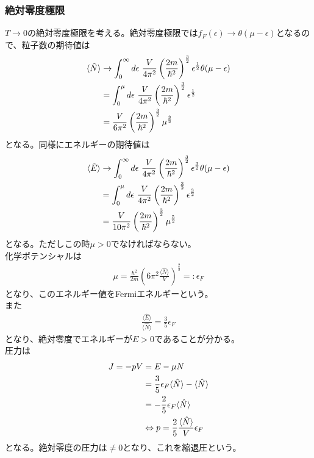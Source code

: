 \documentclass{jsarticle}  %
\numberwithin{equation}{section} %
\numberwithin{figure}{section}
\begin{document}
\subsubsection{絶対零度極限}
    $T \rightarrow 0$の絶対零度極限を考える。絶対零度極限では$f_F (\epsilon) \rightarrow \theta (\mu - \epsilon)$となるので、粒子数の期待値は
    \begin{align}
        \langle \hat{N} \rangle &\rightarrow \int_0^{\infty} d\epsilon\ \frac{V}{4 \pi^2} \left( \frac{2m}{\hbar^2} \right)^{\frac{3}{2}} \epsilon^\frac{1}{2} \theta (\mu - \epsilon) \notag \\
        &= \int_0^{\mu} d\epsilon\ \frac{V}{4 \pi^2} \left( \frac{2m}{\hbar^2} \right)^{\frac{3}{2}} \epsilon^\frac{1}{2} \notag \\
        &= \frac{V}{6 \pi^2} \left( \frac{2m}{\hbar^2} \right)^{\frac{3}{2}} \mu^\frac{3}{2}
    \end{align}
    となる。同様にエネルギーの期待値は
    \begin{align}
        \langle \hat{E} \rangle &\rightarrow \int_0^{\infty} d\epsilon\  \frac{V}{4 \pi^2} \left( \frac{2m}{\hbar^2} \right)^{\frac{3}{2}} \epsilon^\frac{3}{2} \theta (\mu - \epsilon) \notag \\
        &= \int_0^{\mu} d\epsilon\  \frac{V}{4 \pi^2} \left( \frac{2m}{\hbar^2} \right)^{\frac{3}{2}} \epsilon^\frac{3}{2} \notag \\
        &= \frac{V}{10 \pi^2} \left( \frac{2m}{\hbar^2} \right)^{\frac{3}{2}} \mu^\frac{5}{2} 
    \end{align}
    となる。ただしこの時$\mu > 0$でなければならない。\\
    化学ポテンシャルは
    \begin{align}
        \mu =  \frac{\hbar^2}{2m} \left( 6\pi^2 \frac{\langle\hat{N} \rangle}{V} \right)^\frac{2}{3} =: \epsilon_F 
    \end{align}
    となり、このエネルギー値をFermiエネルギーという。\\
    また
    \begin{align}
        \frac{\langle \hat{E} \rangle}{\langle \hat{N} \rangle } = \frac{3}{5} \epsilon_F
    \end{align}
    となり、絶対零度でエネルギーが$E>0$であることが分かる。\\
    圧力は
    \begin{align}
        J = -pV &= E - \mu N \notag \\
        &= \frac{3}{5} \epsilon_F \langle \hat{N} \rangle  - \langle \hat{N} \rangle \notag \\
        &= -\frac{2}{5} \epsilon_F \langle \hat{N} \rangle \notag \\
        &\Leftrightarrow p = \frac{2}{5} \frac{ \langle \hat{N} \rangle}{V} \epsilon_F
    \end{align}
    となる。絶対零度の圧力は$\ne 0 $となり、これを縮退圧という。
\end{document}
